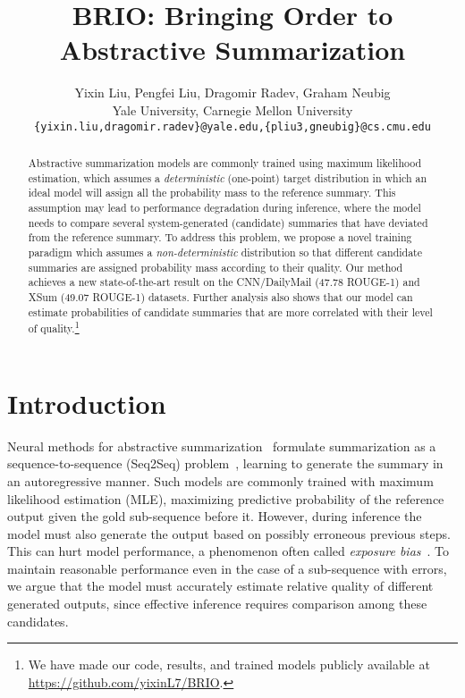 \documentclass[11pt]{article}
\title{BRIO: Bringing Order to Abstractive Summarization}
\author{Yixin Liu, Pengfei Liu, Dragomir Radev, Graham Neubig \\
Yale University, Carnegie Mellon University \\
\texttt{\{yixin.liu,dragomir.radev\}@yale.edu,\{pliu3,gneubig\}@cs.cmu.edu}
  }
\begin{document}
\maketitle
\begin{abstract}

Abstractive summarization models are commonly trained using maximum likelihood estimation, which assumes a \textit{deterministic} (one-point) target distribution in which an ideal model will assign all the probability mass to the reference summary.
This assumption may lead to performance degradation during inference, where the model needs to compare several system-generated (candidate) summaries that have deviated from the reference summary.
To address this problem, we propose a novel training paradigm which assumes a \textit{non-deterministic} distribution so that different candidate summaries are assigned probability mass according to their quality. 
Our method achieves a new state-of-the-art result on the CNN/DailyMail (47.78 ROUGE-1) and XSum (49.07 ROUGE-1) datasets.
Further analysis also shows that our model can estimate probabilities of candidate summaries that are more correlated with their level of quality.\footnote{We have made our code, results, and trained models publicly available at \url{https://github.com/yixinL7/BRIO}.}

\end{abstract}

\section{Introduction}

Neural methods for abstractive summarization~\cite{rush-etal-2015-neural, nallapati-etal-2016-abstractive, chopra-etal-2016-abstractive, lewis-etal-2020-bart, zhang2020pegasus} formulate summarization as a sequence-to-sequence (Seq2Seq) problem~\citep{10.5555/2969033.2969173}, learning to generate the summary in an autoregressive manner.
Such models are commonly trained with maximum likelihood estimation (MLE), maximizing predictive probability of the reference output given the gold sub-sequence before it.
However, during inference the model must also generate the output based on possibly erroneous previous steps. This can hurt model performance, a phenomenon often called \textit{exposure bias}~\citep{10.5555/2969239.2969370, DBLP:journals/corr/RanzatoCAZ15}.
To maintain reasonable performance even in the case of a sub-sequence with errors, we argue that the model must accurately estimate relative quality of different generated outputs, since effective inference requires comparison among these candidates. 
\end{document}
